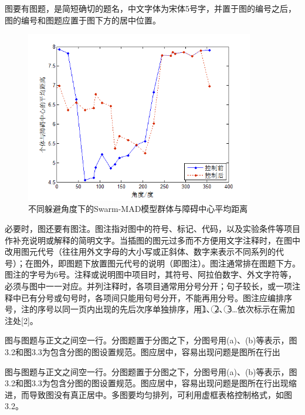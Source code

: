 图要有图题，是简短确切的题名，中文字体为宋体5号字，并置于图的编号之后，图的编号和图题应置于图下方的居中位置。\\


\begin{figure} 
	\centering
	\begin{minipage}[t]{0.8\linewidth} 
		\centering 
		\includegraphics[width=10cm]{chapters/3.1}
		\caption{不同躲避角度下的Swarm-MAD模型群体与障碍中心平均距离} 
		\label{fig:3.1} 
	\end{minipage}%
\end{figure}

必要时，图还要有图注。图注指对图中的符号、标记、代码，以及实验条件等项目作补充说明或解释的简明文字。当插图的图元过多而不方便用文字注释时，在图中改用图元代号（往往用外文字母的大小写或正斜体、数字来表示不同系列的代号）；在图外，即图题下放置图元代号的说明（即图注）。图注通常排在图题下方。图注的字号为6号。注释或说明图中项目时，其符号、阿拉伯数字、外文字符等，必须与图中一一对应。并列注释时，各项目通常用分号分开；句子较长，或一项注释中已有分号或句号时，各项间只能用句号分开，不能再用分号。图注应编排序号，注的序号以同一页内出现的先后次序单独排序，用\textcircled{1}、\textcircled{2}、\textcircled{3}…依次标示在需加注处[2]。

图与图题与正文之间空一行。分图题置于分图之下，分图号用(a)、(b)等表示，图3.2和图3.3为包含分图的图设置规范。图应居中，容易出现问题是图所在行出

图与图题与正文之间空一行。分图题置于分图之下，分图号用(a)、(b)等表示，图3.2和图3.3为包含分图的图设置规范。图应居中，容易出现问题是图所在行出现缩进，而导致图没有真正居中。多图要均匀排列，可利用虚框表格控制格式，如图3.2。



